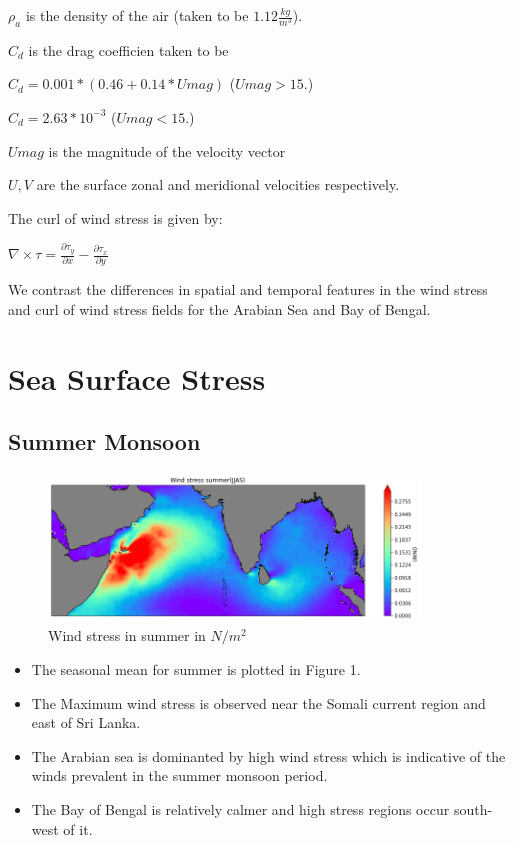 \documentclass[20pt]{article}
\begin{document}
$\rho_a$ is the density of the air (taken to be $1.12 \frac{kg}{m^{3}}$). 

$C_d$ is the drag coefficien taken to be
\begin{center}
    $C_{d} = 0.001*(0.46 + 0.14*Umag)$ ($Umag > 15.$)

    $C_{d} = 2.63*10^{-3}$ ($Umag < 15.$)
\end{center}


$Umag$ is the magnitude of the velocity vector

$U, V$ are the surface zonal and meridional velocities respectively.

The curl of wind stress is given by:
\begin{center}
    $\nabla\times\tau = \frac{\partial \tau_{y}}{\partial x} - \frac{\partial \tau_{x}}{\partial y}$
\end{center}

We contrast the differences in spatial and temporal features in the wind stress and curl of wind stress fields for the 
Arabian Sea and Bay of Bengal. 

\section*{Sea Surface Stress}

\subsection*{Summer Monsoon}

\begin{figure}
    \centering
    \includegraphics[width=0.88\textwidth]{wind_stress_summer.png}
    \caption{Wind stress in summer in $N/m^{2}$}
\end{figure}

\begin{itemize}
    \item The seasonal mean for summer is plotted in Figure 1. 
    \item The Maximum wind stress is observed near the Somali current region and east of Sri Lanka.
    \item The Arabian sea is dominanted by high wind stress which is indicative of the winds prevalent in the summer monsoon period.
    \item The Bay of Bengal is relatively calmer and high stress regions occur south-west of it.
\end{itemize}
\end{document}
